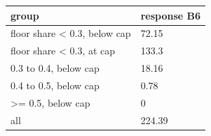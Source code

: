 \begingroup\small
\setlength{\tabcolsep}{3pt}
\renewcommand{\arraystretch}{1.04}
\begin{tabularx}{\linewidth}{XX}
\toprule
group & response B6 \\
\midrule
floor share \textless{} 0.3, below cap & 72.15 \\
floor share \textless{} 0.3, at cap & 133.3 \\
0.3 to 0.4, below cap & 18.16 \\
0.4 to 0.5, below cap & 0.78 \\
\textgreater{}= 0.5, below cap & 0 \\
all & 224.39 \\
\bottomrule
\end{tabularx}
\endgroup
